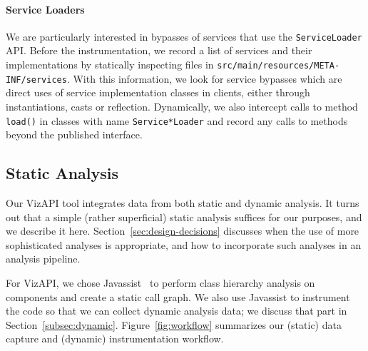 \paragraph{Service Loaders} We are particularly interested in bypasses of 
services that use the \texttt{ServiceLoader} API. Before the instrumentation, we record a list 
of services and their implementations by statically inspecting files in \texttt{src/main/resources/META-INF/services}.
With this information, we look for service bypasses which are direct uses of service implementation 
classes in clients, either through instantiations, casts or reflection. Dynamically, we also intercept calls 
to method \texttt{load()} in classes with name \texttt{Service*Loader} and record any calls to methods beyond 
the published interface.

\subsection{Static Analysis}
\label{subsec:static}
Our VizAPI tool integrates data from both static and dynamic analysis.
It turns out that a simple (rather superficial) static analysis suffices
for our purposes, and we describe it here. Section~\ref{sec:design-decisions}
discusses when the use of more sophisticated analyses is appropriate, and
how to incorporate such analyses in an analysis pipeline.

For VizAPI, we chose Javassist~\cite{chiba00:_load_struc_reflec_java} to
perform class hierarchy analysis on components and create a static call
graph. We also use Javassist to instrument the code so that we can
collect dynamic analysis data; we discuss that part in
Section~\ref{subsec:dynamic}. Figure~\ref{fig:workflow} summarizes our
(static) data capture and (dynamic) instrumentation workflow.  \\

